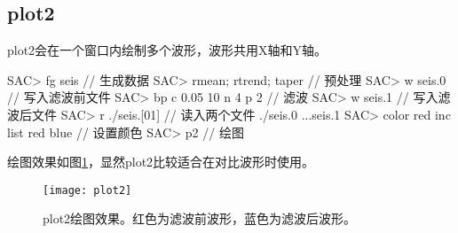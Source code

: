 \subsection{plot2}
plot2会在一个窗口内绘制多个波形，波形共用X轴和Y轴。
\begin{SACCode}
SAC> fg seis                     // 生成数据
SAC> rmean; rtrend; taper        // 预处理
SAC> w seis.0                    // 写入滤波前文件
SAC> bp c 0.05 10 n 4 p 2        // 滤波
SAC> w seis.1                    // 写入滤波后文件
SAC> r ./seis.[01]               // 读入两个文件
./seis.0 ...seis.1
SAC> color red inc list red blue // 设置颜色
SAC> p2                          // 绘图
\end{SACCode}
绘图效果如图\ref{fig:plot2}，显然plot2比较适合在对比波形时使用。

\begin{figure}[H]
\centering
\texttt{[image: plot2]}
\caption[plot2绘图效果]{plot2绘图效果。红色为滤波前波形，蓝色为滤波后波形。}
\label{fig:plot2}
\end{figure}


